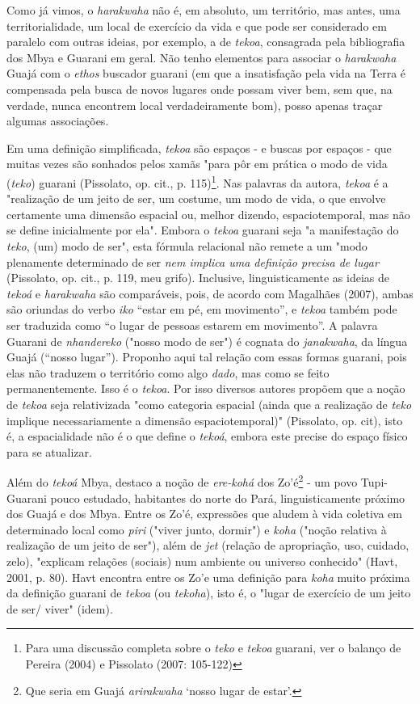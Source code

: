 Como já vimos, o \emph{harakwaha} não é, em absoluto, um território{,}
mas antes, uma territorialidade, um local de exercício da vida e que
pode ser considerado em paralelo com outras ideias, por exemplo, a de
\emph{tekoa}, consagrada pela bibliografia dos Mbya e Guarani em geral.
Não tenho elementos para associar o \emph{harakwaha} Guajá com o
\emph{ethos} buscador guarani (em que a insatisfação pela vida na Terra
é compensada pela busca de novos lugares onde possam viver bem, sem que,
na verdade, nunca encontrem local verdadeiramente bom), posso apenas
traçar algumas associações.

Em uma definição simplificada, \emph{tekoa} são espaços - e buscas por
espaços - que muitas vezes são sonhados pelos xamãs "para pôr em prática
o modo de vida (\emph{teko}) guarani (Pissolato, op. cit., p.
115)\footnote{Para uma discussão completa sobre o \emph{teko} e
  \emph{tekoa} guarani, ver o balanço de Pereira (2004) e Pissolato
  (2007: 105-122)}. Nas palavras da autora, \emph{tekoa} é a "realização
de um jeito de ser, um costume, um modo de vida, o que envolve
certamente uma dimensão espacial ou, melhor dizendo, espaciotemporal,
mas não se define inicialmente por ela". Embora o \emph{tekoa} guarani
seja "a manifestação do \emph{teko}, (um) modo de ser", esta fórmula
relacional não remete a um "modo plenamente determinado de ser \emph{nem
implica uma definição precisa de lugar} (Pissolato, op. cit., p. 119,
meu grifo). Inclusive, linguisticamente as ideias de \emph{tekoá} e
\emph{harakwaha} são comparáveis, pois, de acordo com Magalhães (2007),
ambas são oriundas do verbo \emph{iko} ``estar em pé, em movimento'', e
\emph{tekoa} também pode ser traduzida como ``o lugar de pessoas estarem
em movimento''. A palavra Guarani de \emph{nhandereko} ("nosso modo de
ser") é cognata do \emph{janakwaha}, da língua Guajá (``nosso lugar'').
Proponho aqui tal relação com essas formas guarani, pois elas não
traduzem o território como algo \emph{dado}, mas como se feito
permanentemente. Isso é o \emph{tekoa}. Por isso diversos autores
propõem que a noção de \emph{tekoa} seja relativizada "como categoria
espacial (ainda que a realização de \emph{teko} implique necessariamente
a dimensão espaciotemporal)" (Pissolato, op. cit), isto é, a
espacialidade não é o que define o \emph{tekoá}, embora este precise do
espaço físico para se atualizar.

Além do \emph{tekoá} Mbya, destaco a noção de \emph{ere-kohá} dos
Zo'é\footnote{Que seria em Guajá \emph{arirakwaha} `nosso lugar de
  estar'.} - um povo Tupi-Guarani pouco estudado, habitantes do norte do
Pará, linguisticamente próximo dos Guajá e dos Mbya. Entre os Zo'é,
expressões que aludem à vida coletiva em determinado local como
\emph{piri} ("viver junto, dormir") e \emph{koha} ("noção relativa à
realização de um jeito de ser"), além de \emph{jet} (relação de
apropriação, uso, cuidado, zelo), "explicam relações (sociais) num
ambiente ou universo conhecido" (Havt, 2001, p. 80). Havt encontra entre
os Zo'e uma definição para \emph{koha} muito próxima da definição
guarani de \emph{tekoa} (ou \emph{tekoha}), isto é, o "lugar de
exercício de um jeito de ser/ viver" (idem).

